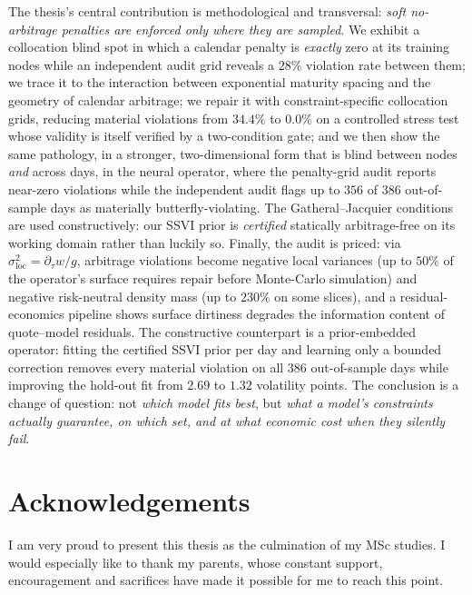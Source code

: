 \documentclass[11pt,a4paper]{report}
\theoremstyle{definition}
\theoremstyle{remark}
\theoremstyle{plain}
\begin{document}
\hspace*{1em} The thesis's central contribution is methodological and transversal: \emph{soft no-arbitrage penalties are enforced only where they are sampled}. We exhibit a collocation blind spot in which a calendar penalty is \emph{exactly} zero at its training nodes while an independent audit grid reveals a $28\%$ violation rate between them; we trace it to the interaction between exponential maturity spacing and the geometry of calendar arbitrage; we repair it with
constraint-specific collocation grids, reducing material violations from $34.4\%$ to $0.0\%$ on a
controlled stress test whose validity is itself verified by a two-condition gate; and we then show
the same pathology, in a stronger, two-dimensional form that is blind between nodes \emph{and} across days, in the neural operator, where the penalty-grid audit reports near-zero violations while the independent audit flags up to $356$ of $386$ out-of-sample days as materially butterfly-violating. The Gatheral--Jacquier conditions are used constructively: our SSVI prior is \emph{certified}
statically arbitrage-free on its working domain rather than luckily so. Finally, the audit is
priced: via $\sigma_{\mathrm{loc}}^2 = \partial_\tau w / g$, arbitrage violations
become negative local variances (up to $50\%$ of the operator's surface requires repair before
Monte-Carlo simulation) and negative risk-neutral density mass (up to $230\%$ on some slices), and a residual-economics pipeline shows surface dirtiness degrades the information content of quote--model residuals. The constructive counterpart is a prior-embedded operator: fitting the certified SSVI prior per day and learning only a bounded correction removes every material violation on all $386$ out-of-sample days while improving the hold-out fit from $2.69$ to $1.32$ volatility points. The conclusion is a change of question: not \emph{which model fits best}, but \emph{what a model's constraints actually guarantee, on which set, and at what economic cost when they silently fail}.




\chapter*{Acknowledgements}

\begingroup
\setlength{\parindent}{0pt}

I am very proud to present this thesis as the culmination of my MSc studies. I would especially like to thank my parents, whose constant support, encouragement and sacrifices have made it possible for me to reach this point.
\end{document}
